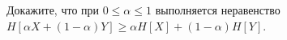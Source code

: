 Докажите, что при $0 \le \alpha \le 1$ выполняется неравенство $H[\alpha X + (1 - \alpha)Y] \ge \alpha H[X] + (1 - \alpha) H[Y]$.